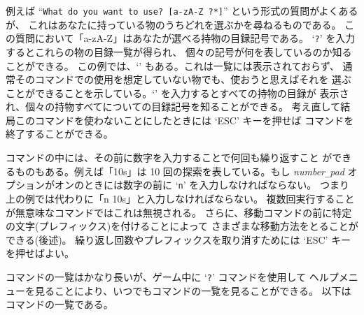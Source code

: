 例えば
``{\tt What do you want to use? [a-zA-Z\ ?*]}'' という形式の質問がよくあるが、
これはあなたに持っている物のうちどれを選ぶかを尋ねるものである。
この質問において「a-zA-Z」はあなたが選べる持物の目録記号である。
`{\tt ?}' を入力するとこれらの物の目録一覧が得られ、
個々の記号が何を表しているのか知ることができる。
この例では、`{\tt *}' もある。これは一覧には表示されておらず、
通常そのコマンドでの使用を想定していない物でも、使おうと思えばそれを
選ぶことができることを示している。`{\tt *}' を入力するとすべての持物の目録が
表示され、個々の持物すべてについての目録記号を知ることができる。
考え直して結局このコマンドを使わないことにしたときには `ESC' キーを押せば
コマンドを終了することができる。

コマンドの中には、その前に数字を入力することで何回も繰り返すこと
ができるものもある。例えば「10s」は 10 回の探索を表している。もし
{\it number\verb+_+pad\/}
オプションがオンのときには数字の前に `{\tt n}' を入力しなければならない。
つまり上の例では代わりに「n 10s」と入力しなければならない。
複数回実行することが無意味なコマンドではこれは無視される。
さらに、移動コマンドの前に特定の文字(プレフィックス)を付けることによって
さまざまな移動方法をとることができる(後述)。
繰り返し回数やプレフィックスを取り消すためには `ESC' キーを押せばよい。

コマンドの一覧はかなり長いが、ゲーム中に `{\tt ?}' コマンドを使用して
ヘルプメニューを見ることにより、いつでもコマンドの一覧を見ることができる。
以下はコマンドの一覧である。

